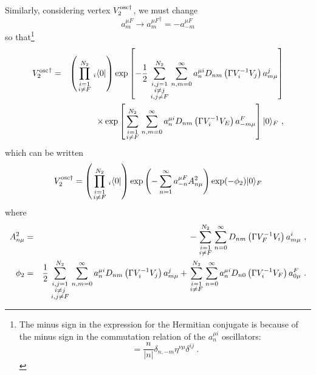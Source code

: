 \documentclass[a4paper,11pt]{article}
\begin{document}
Similarly, considering vertex $V^{{\rm osc}\dagger }_2$, we must change
\begin{equation}
a_m^{\mu F}\rightarrow {a_m^{\mu F}}^\dagger =-a_{-m}^{\mu F}
\end{equation}
so that\footnote{The minus sign in the expression for the Hermitian conjugate is because of the minus sign in the commutation relation of the $a^{\mu i}_n$ oscillators:
\begin{equation}
[a_n^{\mu i},a^{\nu j}_m]=\frac{n}{|n|}\delta _{n,-m}\eta ^{\nu \mu }\delta ^{ij}\ .
\end{equation}}
\begin{eqnarray}
{V^{\rm osc}_2}^\dagger  & = & \left( \prod_{\scriptstyle i=1\atop \scriptstyle i\neq F}^{N_2}{ }_i\langle 0|\right) \exp \left[ -\frac{1}{2}\sum_{{\scriptstyle i,j=1\atop \scriptstyle i\neq j}\atop \scriptstyle i,j\neq F}^{N_2}\sum_{n,m=0}^\infty a^{\mu i}_nD_{nm}\left( \Gamma V^{-1}_iV_j\right) a^j_{m\mu }\right] \nonumber \\
 & & \times \exp \left[ \sum_{\scriptstyle i=1\atop \scriptstyle i\neq F}^{N_2}\sum_{n,m=0}^\infty a^{\mu i}_nD_{nm}\left( \Gamma V^{-1}_iV_E\right) a^F_{-m\mu }\right] |0\rangle _F\ ,
\end{eqnarray}
which can be written
\begin{equation}
V^{{\rm osc}\dagger }_2=\left( \prod_{\scriptstyle i=1\atop \scriptstyle i\neq F}^{N_2}{ }_i\langle 0|\right) \exp \left( -\sum_{n=1}^\infty a^{\mu F}_{-n}A^2_{n\mu }\right) \exp (-\phi _2)|0\rangle _F
\end{equation}
where
\begin{eqnarray}
A^2_{n\mu } & = & -\sum_{\scriptstyle i=1\atop \scriptstyle i\neq F}^{N_2}\sum_{n=0}^\infty D_{nm}\left( \Gamma V^{-1}_FV_i\right) a^i_{m\mu }\ ,\\ 
\phi _2 & = & \frac{1}{2}\sum_{{\scriptstyle i,j=1\atop \scriptstyle i\neq j}\atop \scriptstyle i,j\neq F}^{N_2}\sum_{n,m=0}^\infty a^{\mu i}_nD_{nm}\left( \Gamma V^{-1}_iV_j\right) a^j_{m\mu } +\sum_{\scriptstyle i=1\atop \scriptstyle i\neq F}^{N_2}\sum_{n=0}^\infty a^{\mu i}_nD_{n0}\left( \Gamma V^{-1}_iV_F\right) a^F_{0\mu }\ .
\end{eqnarray}
\end{document}
